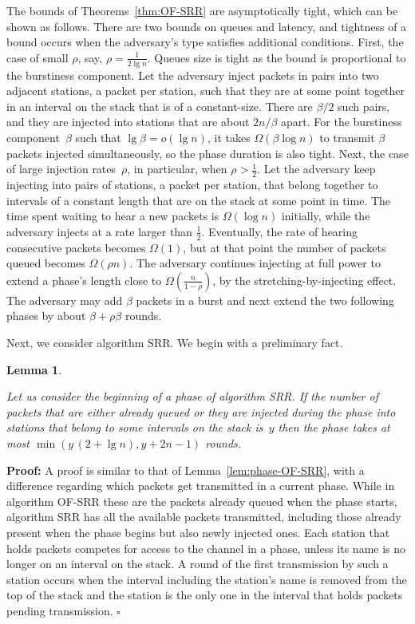 \documentclass[11pt]{article}
\newcommand{\qed}{\hfill $\square$}
\newtheorem{lemma}{Lemma}
\newenvironment{proof}{\noindent\textbf{Proof: }}{\qed \smallbreak}
\begin{document}
The bounds of Theorems~\ref{thm:OF-SRR} are asymptotically tight, which can be shown as follows.
There are two bounds on queues and latency, and tightness of a bound occurs when the adversary's type satisfies additional conditions. 
First, the case of small $\rho$, say, $\rho=\frac{1}{2\lg n}$.
Queues size is tight as the bound is proportional to the burstiness component.
Let the adversary inject packets in pairs into two adjacent stations, a packet per station, such that they are at some point together in an interval on the stack that is of a constant-size.
There are $\beta/2$ such pairs, and they are injected into stations that are about $2n/\beta$ apart.
For the burstiness component~$\beta$ such that $\lg \beta =o(\lg n)$, it takes $\Omega(\beta\log n)$ to transmit $\beta$ packets injected simultaneously, so the phase duration is also tight.
Next, the case of large injection rates~$\rho$, in particular, when $\rho>\frac{1}{2}$.
Let the adversary keep injecting into pairs of stations, a packet per station, that belong together to intervals of a constant length that are on the stack at some point in time. 
The time spent waiting to hear a new packets is $\Omega(\log n)$ initially, while the adversary injects at a rate larger than $\frac{1}{2}$.
Eventually, the rate of hearing consecutive packets becomes $\Omega(1)$, but at that point the number of packets queued becomes $\Omega(\rho n)$. 
The adversary continues injecting at full power to extend a phase's length close to $\Omega(\frac{n}{1-\rho})$, by the stretching-by-injecting effect.
The adversary may add $\beta$ packets in a burst and next extend the two following phases by about $\beta+\rho\beta$ rounds. 

Next, we consider algorithm \textsc{SRR}.
We begin with a preliminary fact.



\begin{lemma}
\label{lem:phase-SRR}

Let us consider the beginning of a phase of algorithm \textsc{SRR}.
If the number of packets that are either already queued  or they are injected during the phase into stations that belong to some intervals on the stack is~$y$ then the phase takes at most $\min ( y\,(2+\lg n), y+2n-1)$ rounds.
\end{lemma}

\begin{proof}
A proof is similar to that of Lemma~\ref{lem:phase-OF-SRR}, with a difference regarding  which packets get transmitted in a current phase.
While in algorithm \textsc{OF-SRR} these are the packets already queued when the phase starts, algorithm \textsc{SRR} has all the available packets transmitted, including those already present when the phase begins but also newly injected ones.
Each station that holds packets competes for access to the channel in a phase, unless its name is no longer on an interval on the stack.
A round of the first transmission by such a station occurs when the interval including the station's name is removed from the top of the stack and the station is the only one in the interval that holds packets pending transmission.
\end{proof}
\end{document}
